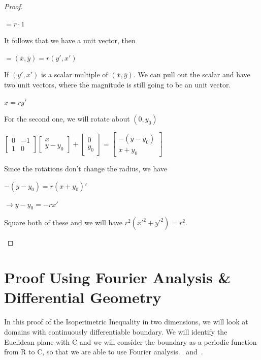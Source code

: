 \documentclass[a4paper]{book}
\numberwithin{theorem}{section}%
\begin{document}
\begin{proof}
\begin{enumerate}
\begin{center}
            $\displaystyle =r\cdot1$
        \end{center}
        It follows that we have a unit vector, then
        \begin{center}
            $\displaystyle =(\overline{x},\overline{y})=r(y',x')$
        \end{center}
        If $(y',x')$ is a scalar multiple of $(\overline{x},\overline{y})$. We can pull out the scalar and have two unit vectors, where the magnitude is still going to be an unit vector.
        \begin{center}
            $\displaystyle x=ry'$
        \end{center}
        For the second one, we will rotate about $(0,y_0)$
        \begin{center}
            $\displaystyle \begin{bmatrix}
                0 & -1\\
                1 & 0
            \end{bmatrix}
            \begin{bmatrix}
                x\\
                y-y_{0}
            \end{bmatrix}+
            \begin{bmatrix}
                0\\
                y_{0}
            \end{bmatrix}=\begin{bmatrix}
                -(y-y_{0})\\
                x+y_{0}
            \end{bmatrix}$
        \end{center}
        Since the rotations don't change the radius, we have
        \begin{center}
            $\displaystyle -(y-y_{0})=r(x+y_{0})'$

            $\displaystyle \longrightarrow y-y_{0}=-rx'$
        \end{center}
        Square both of these and we will have $\displaystyle r^{2}(x'^{2}+y'^{2})=r^{2}$.
    \end{enumerate}
\end{proof}

\section{Proof Using Fourier Analysis {\&} Differential Geometry}
In this proof of the Isoperimetric Inequality in two dimensions, we will look at domains
with continuously differentiable boundary. We will identify the Euclidean plane with $\mathrm{C}$
and we will consider the boundary as a periodic function from $\mathrm{R}$ to $\mathrm{C}$, so that we are able
to use Fourier analysis.~\citep{bar2010elementare} and~\citep{gehring2019isoperimetric}.
\end{document}
